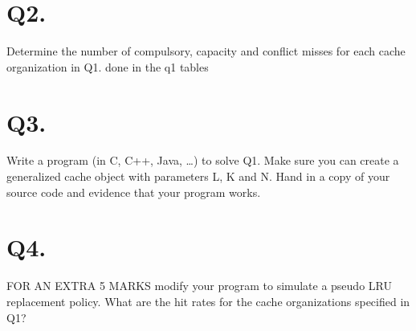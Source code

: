\documentclass{article}
\begin{document}
\section{Q2.}

Determine the number of compulsory, capacity and conflict misses for each cache
organization in Q1.
 done in the q1 tables

\section{Q3.}
 Write a program (in C, C++, Java, …) to solve Q1. Make sure you can create a generalized
cache object with parameters L, K and N. Hand in a copy of your source code and evidence
that your program works.

\section{Q4.}
 FOR AN EXTRA 5 MARKS modify your program to simulate a pseudo LRU replacement policy. What
are the hit rates for the cache organizations specified in Q1?













\pagebreak

	
\end{document}
